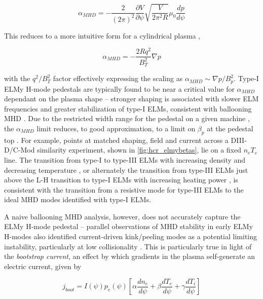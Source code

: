 \begin{equation}\label{eq:alphaMHD}
 \alpha_{MHD} = - \frac{2}{(2\pi)^2} \frac{\partial V}{\partial \psi} \sqrt{\frac{V}{2\pi^2 R}} \mu_0 \frac{dp}{d\psi}
\end{equation}

\noindent This reduces to a more intuitive form for a cylindrical plasma \cite{Connor1978},

\begin{equation}\label{eq:alphaMHD_cyl}
 \alpha_{MHD} = -\frac{2Rq^2}{B_T^2} \nabla p
\end{equation}

\noindent with the $q^2/B_T^2$ factor effectively expressing the scaling as $\alpha_{MHD} \sim \nabla p / B_p^2$.  Type-I ELMy H-mode pedestals are typically found to be near a critical value for $\alpha_{MHD}$ dependant on the plasma shape \cite{Osborne1998} -- stronger shaping is associated with slower ELM frequencies and greater stabilization of type-I ELMs, consistent with ballooning MHD \cite{Zohm1996,Saibene1999,Urano2003}.  Due to the restricted width range for the pedestal on a given machine \cite{Maggi2010,Schneider2013}, the $\alpha_{MHD}$ limit reduces, to good approximation, to a limit on $\beta_{p}$ at the pedestal top \cite{Saibene1999,Urano2003}.  For example, points at matched shaping, field and current across a DIII-D/C-Mod similarity experiment, shown in \cref{fig:hcr_elmybetas}, lie on a fixed $n_e T_e$ line.  The transition from type-I to type-III ELMs with increasing density and decreasing temperature \cite{Saibene1999}, or alternately the transition from type-III ELMs just above the L-H 
transition to type-I ELMs with increasing heating power \cite{Connor1998}, is consistent with the transition from a resistive mode for type-III ELMs to the ideal MHD modes identified with type-I ELMs.

A naive ballooning MHD analysis, however, does not accurately capture the ELMy H-mode pedestal -- parallel observations of MHD stability in early ELMy H-modes also identified current-driven kink/peeling modes as a potential limiting instability, particularly at low collisionality \cite{Connor1998,Suttrop2000,Groebner1998a}.  This is particularly true in light of the \emph{bootstrap current}, an effect by which gradients in the plasma self-generate an electric current, given by \cite{Sauter1999}

\begin{equation}\label{eq:jboot}
 j_{boot} = I(\psi) p_e(\psi) \left[ \alpha \frac{dn_e}{d\psi} + \beta \frac{dT_e}{d\psi} + \gamma \frac{dT_i}{d\psi}\right]
\end{equation}

